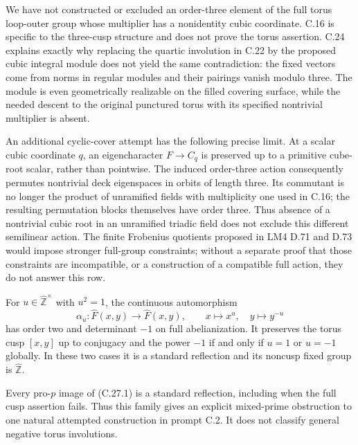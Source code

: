 We have not constructed or excluded an
order-three element of the full torus
loop-outer group whose multiplier has a
nonidentity cubic coordinate.  C.16 is
specific to the three-cusp structure and
does not prove the torus assertion.
C.24 explains exactly why replacing the
quartic involution in C.22 by the proposed
cubic integral module does not yield the
same contradiction: the fixed vectors
come from norms in regular modules and
their pairings vanish modulo three.
The module is even geometrically realizable
on the filled covering surface, while the
needed descent to the original punctured
torus with its specified nontrivial multiplier
is absent.

An additional cyclic-cover attempt has the
following precise limit.  At a scalar cubic
coordinate $q$, an eigencharacter
$F\to C_q$ is preserved up to a primitive
cube-root scalar, rather than pointwise.
The induced order-three action consequently
permutes nontrivial deck eigenspaces in
orbits of length three.  Its commutant is
no longer the product of unramified fields
with multiplicity one used in C.16; the
resulting permutation blocks themselves
have order three.  Thus absence of a
nontrivial cubic root in an unramified
triadic field does not exclude this different
semilinear action.
The finite Frobenius quotients proposed in
LM4 D.71 and D.73 would impose stronger
full-group constraints; without a separate
proof that those constraints are incompatible,
or a construction of a compatible full
action, they do not answer this row.

For $u\in\widehat{\mathbb Z}^{\times}$ with $u^2=1$, the
continuous automorphism
\[
 \alpha_u:\widehat F(x,y)\longrightarrow\widehat F(x,y),
 \qquad x\longmapsto x^u,\quad y\longmapsto y^{-u}           \tag{C.27.1}
\]
has order two and determinant $-1$ on full abelianization.
It preserves the torus cusp $[x,y]$ up to conjugacy and
the power $-1$ if and only if $u=1$ or $u=-1$ globally.
In these two cases it is a standard reflection and its
noncusp fixed group is $\widehat{\mathbb Z}$.

Every pro-$p$ image of (C.27.1) is a standard reflection,
including when the full cusp assertion fails.  Thus this
family gives an explicit mixed-prime obstruction to
one natural attempted construction in prompt C.2.
It does not classify general negative torus involutions.

